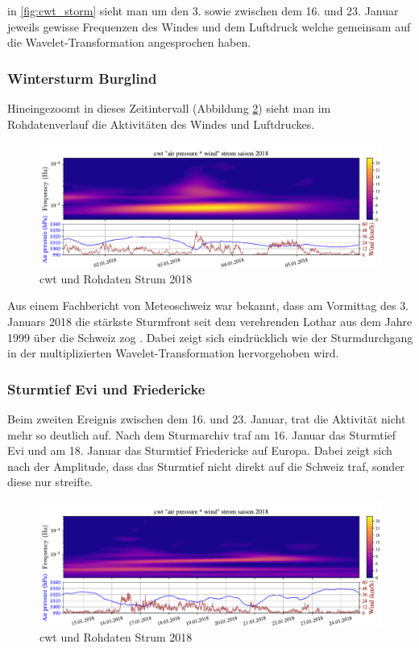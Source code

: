 \begin{refsection}
in \ref{fig:cwt_storm} \space sieht man um den 3. sowie zwischen dem 16. und 23. Januar jeweils gewisse Frequenzen des Windes und dem Luftdruck welche gemeinsam auf die Wavelet-Transformation angesprochen haben.

\subsubsection{Wintersturm Burglind}
Hineingezoomt in dieses Zeitintervall (Abbildung \ref{fig:cwt_storm_zoom}) sieht man im Rohdatenverlauf die Aktivitäten des Windes und Luftdruckes. 
\begin{figure}
	\centering
	\includegraphics[width=1\textwidth]{papers/wwt/images/storm_airp_wind_zoom.pdf}
	\caption{cwt und Rohdaten Strum 2018}
	\label{fig:cwt_storm_zoom}
\end{figure}
Aus einem Fachbericht von Meteoschweiz war bekannt, dass am Vormittag des 3. Januars 2018 die stärkste Sturmfront seit dem verehrenden Lothar aus dem Jahre 1999 über die Schweiz zog \cite{Fachbericht:Burglind}.
Dabei zeigt sich eindrücklich wie der Sturmdurchgang in der multiplizierten Wavelet-Transformation hervorgehoben wird.

\subsubsection{Sturmtief Evi und Friedericke }
Beim zweiten Ereignis zwischen dem 16. und 23. Januar, trat die Aktivität nicht mehr so deutlich auf.
Nach dem Sturmarchiv\cite{online:sturmarchiv} traf am 16. Januar das Sturmtief Evi und am 18. Januar das Sturmtief Friedericke auf Europa. Dabei zeigt sich nach der Amplitude, dass das Sturmtief nicht direkt auf die Schweiz traf, sonder diese nur streifte. 

\begin{figure}[b]
	\centering
	\includegraphics[width=1\textwidth]{papers/wwt/images/storm_airp_wind_zoom2.pdf}
	\caption{cwt und Rohdaten Strum 2018}
	\label{fig:cwt_storm_zoom}
\end{figure}




\end{refsection}
